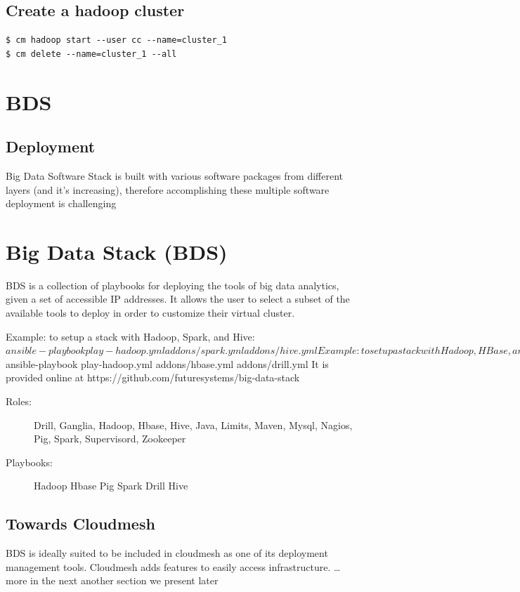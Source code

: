 \subsection{Create a hadoop cluster}

\begin{Verbatim}[fontfamily=helvetica]
$ cm hadoop start --user cc --name=cluster_1
$ cm delete --name=cluster_1 --all  
\end{Verbatim}


\section{BDS}

\subsection{Deployment}

Big Data Software Stack is built with various software packages from different layers (and it’s increasing), therefore accomplishing these multiple software deployment is challenging



\section{Big Data Stack (BDS)}

BDS is a collection of playbooks for deploying the tools of big data analytics, given a set of accessible IP addresses. It allows the user to select a subset of the available tools to deploy in order to customize their virtual cluster.

Example: to setup a stack with Hadoop, Spark, and Hive:
$ ansible-playbook play-hadoop.yml addons/spark.yml addons/hive.yml
Example: to setup a stack with Hadoop, HBase, and Drill:
$ ansible-playbook play-hadoop.yml addons/hbase.yml addons/drill.yml
It is provided online at https://github.com/futuresystems/big-data-stack

\begin{description}

\item[Roles:]
Drill,
Ganglia,
Hadoop,
Hbase,
Hive,
Java,
Limits,
Maven,
Mysql,
Nagios,
Pig,
Spark,
Supervisord,
Zookeeper

\item[Playbooks:]
Hadoop
Hbase
Pig
Spark
Drill
Hive
\end{description}

\subsection{Towards Cloudmesh}
BDS is ideally suited to be included in cloudmesh as one of its deployment management tools. Cloudmesh adds features to easily access infrastructure.
  … more in the next another section we present later

